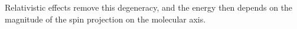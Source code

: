 Relativistic effects remove this degeneracy, and the energy then depends on the magnitude of the spin projection on the molecular axis.
